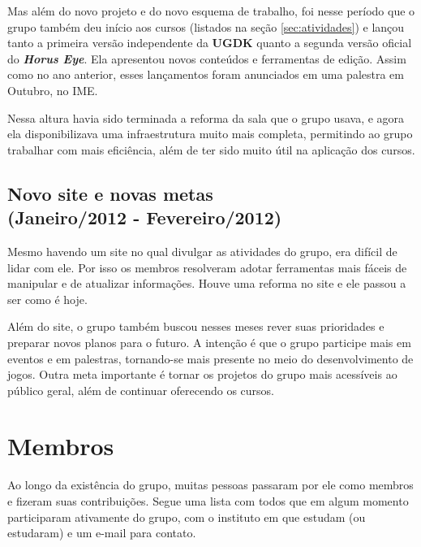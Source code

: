 \documentclass[12pt,onecolumn,a4paper]{article}
\begin{document}
        Mas além do novo projeto e do novo esquema de trabalho, foi nesse período que o grupo também
        deu início aos cursos (listados na seção \ref{sec:atividades}) e lançou tanto a primeira
        versão independente da \textbf{UGDK} quanto a segunda versão oficial do
        \textit{\textbf{Horus Eye}}. Ela apresentou novos conteúdos e ferramentas de edição. Assim
        como no ano anterior, esses lançamentos foram anunciados em uma palestra em Outubro, no IME.
        
        Nessa altura havia sido terminada a reforma da sala que o grupo usava, e agora ela
        disponibilizava uma infraestrutura muito mais completa, permitindo ao grupo trabalhar com
        mais eficiência, além de ter sido muito útil na aplicação dos cursos.

    \clearpage
    \subsection{Novo site e novas metas \\
                {\small(Janeiro/2012 - Fevereiro/2012)} }
        Mesmo havendo um site no qual divulgar as atividades do grupo, era difícil de lidar com ele.
        Por isso os membros resolveram adotar ferramentas mais fáceis de manipular e de atualizar
        informações. Houve uma reforma no site e ele passou a ser como é hoje.
        
        Além do site, o grupo também buscou nesses meses rever suas prioridades e preparar novos
        planos para o futuro. A intenção é que o grupo participe mais em eventos e em palestras,
        tornando-se mais presente no meio do desenvolvimento de jogos. Outra meta importante é
        tornar os projetos do grupo mais acessíveis ao público geral, além de continuar oferecendo
        os cursos.

\clearpage
\section{\LARGE Membros}
    Ao longo da existência do grupo, muitas pessoas passaram por ele como membros e fizeram suas
    contribuições. Segue uma lista com todos que em algum momento participaram ativamente do grupo,
    com o instituto em que estudam (ou estudaram) e um e-mail para contato.
    
\end{document}
